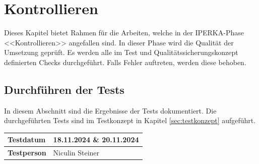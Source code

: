 \chapter{Kontrollieren}\label{ch:kontrollieren}
Dieses Kapitel bietet Rahmen für die Arbeiten, welche in der IPERKA-Phase <<Kontrollieren>> angefallen sind. In dieser Phase wird die Qualität der Umsetzung geprüft. Es werden alle im Test und Qualitätssicherungskonzept definierten Checks durchgeführt. Falls Fehler auftreten, werden diese behoben.
\section{Durchführen der Tests}
In diesem Abschnitt sind die Ergebnisse der Tests dokumentiert. Die durchgeführten Tests sind im Testkonzept in Kapitel \ref{sec:testkonzept} aufgeführt.
\begin{longtable}{|p{}|p{}|}
	\hline
	\textbf{Testdatum} & 18.11.2024 \& 20.11.2024\\
	\hline
	\textbf{Testperson} & Niculin Steiner\\
	\hline
\end{longtable}

